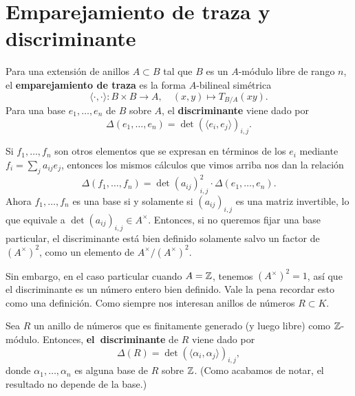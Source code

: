 
\section{Emparejamiento de traza y discriminante}

\begin{definicion}
  Para una extensión de anillos $A \subset B$ tal que $B$ es un $A$-módulo
  libre de rango $n$, el \textbf{emparejamiento de traza} es la forma
  $A$-bilineal simétrica
  \[ \langle\cdot,\cdot\rangle\colon B\times B\to A, \quad
     (x,y) \mapsto T_{B/A} (xy). \]
  Para una base $e_1,\ldots,e_n$ de $B$ sobre $A$, el \textbf{discriminante}
  viene dado por
  \[ \Delta (e_1,\ldots,e_n) =
     \det (\langle e_i,e_j\rangle)_{i,j}. \]
\end{definicion}

Si $f_1, \ldots, f_n$ son otros elementos que se expresan en términos de los
$e_i$ mediante $f_i = \sum_j a_{ij} e_j$, entonces los mismos cálculos que vimos
arriba nos dan la relación
\[ \Delta (f_1,\ldots,f_n) = \det (a_{ij})_{i,j}^2 \cdot \Delta (e_1,\ldots,e_n). \]
Ahora $f_1,\ldots,f_n$ es una base si y solamente si $(a_{ij})_{i,j}$ es una
matriz invertible, lo que equivale a $\det (a_{ij})_{i,j} \in A^\times$.
Entonces, si no queremos fijar una base particular, el discriminante está bien
definido solamente salvo un factor de $(A^\times)^2$, como un elemento de
$A^\times/(A^\times)^2$.

Sin embargo, en el caso particular cuando $A = \mathbb{Z}$, tenemos $(A^\times)^2 = 1$,
así que el discriminante es un número entero bien definido. Vale la pena
recordar esto como una definición. Como siempre nos interesan anillos de
números $R \subset K$.

\begin{definicion}
  Sea $R$ un anillo de números que es finitamente generado (y luego libre) como
  $\mathbb{Z}$-módulo. Entonces, \textbf{el~discriminante} de $R$ viene dado por
  $$\Delta (R) = \det (\langle \alpha_i, \alpha_j\rangle)_{i,j},$$
  donde $\alpha_1,\ldots,\alpha_n$ es alguna base de $R$ sobre $\mathbb{Z}$.
  (Como acabamos de notar, el resultado no depende de la base.)
\end{definicion}

